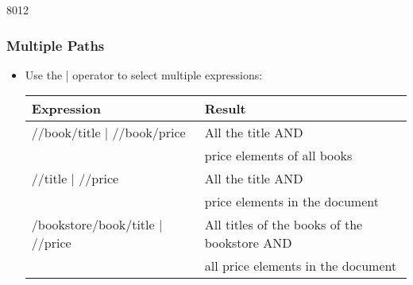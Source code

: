 \begin{slide}[fragile]{8012}
\frametitle{Multiple Paths}
\begin{itemize}
\item Use the | operator to select multiple expressions:
\begin{center}
\begin{tabular}{|l|l|}
\hline
\textbf{Expression}             & \textbf{Result} \\ \hline
//book/title | //book/price     & All the title AND \\
                                & price elements of all books \\ \hline
//title | //price               & All the title AND \\
                                & price elements in the document \\ \hline
/bookstore/book/title | //price & All titles of the books of the bookstore AND \\
                                & all price elements in the document  \\ \hline
\end{tabular}
\end{center}
\end{itemize}
\end{slide}


